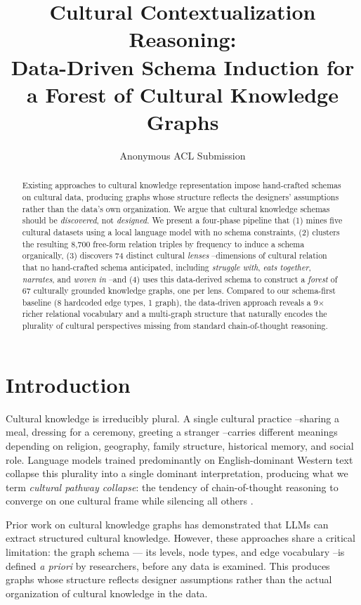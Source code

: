 \documentclass[11pt]{article}
\title{Cultural Contextualization Reasoning:\\
Data-Driven Schema Induction for a Forest of Cultural Knowledge Graphs}
\author{Anonymous ACL Submission}
\begin{document}
\maketitle

\begin{abstract}
Existing approaches to cultural knowledge representation impose
hand-crafted schemas on cultural data, producing graphs whose structure
reflects the designers' assumptions rather than the data's own organization.
We argue that cultural knowledge schemas should be \emph{discovered}, not
\emph{designed}.
We present a four-phase pipeline that (1) mines five cultural datasets using
a local language model with no schema constraints, (2) clusters the resulting
8,700 free-form relation triples by frequency to induce a schema organically,
(3) discovers 74 distinct cultural \emph{lenses} --dimensions of cultural
relation that no hand-crafted schema anticipated, including \emph{struggle
with}, \emph{eats together}, \emph{narrates}, and \emph{woven in} --and
(4) uses this data-derived schema to construct a \emph{forest} of 67
culturally grounded knowledge graphs, one per lens.
Compared to our schema-first baseline (8 hardcoded edge types, 1 graph),
the data-driven approach reveals a 9$\times$ richer relational vocabulary
and a multi-graph structure that naturally encodes the plurality of cultural
perspectives missing from standard chain-of-thought reasoning.
\end{abstract}

\section{Introduction}

Cultural knowledge is irreducibly plural.
A single cultural practice --sharing a meal, dressing for a ceremony,
greeting a stranger --carries different meanings depending on religion,
geography, family structure, historical memory, and social role.
Language models trained predominantly on English-dominant Western text
collapse this plurality into a single dominant interpretation, producing
what we term \emph{cultural pathway collapse}: the tendency of
chain-of-thought reasoning to converge on one cultural frame while
silencing all others \cite{myung2024blend,shi2024culturebank}.

Prior work on cultural knowledge graphs \cite{tonga2026llms} has
demonstrated that LLMs can extract structured cultural knowledge.
However, these approaches share a critical limitation: the graph schema —
its levels, node types, and edge vocabulary --is defined \emph{a priori}
by researchers, before any data is examined.
This produces graphs whose structure reflects designer assumptions rather
than the actual organization of cultural knowledge in the data.
\end{document}
